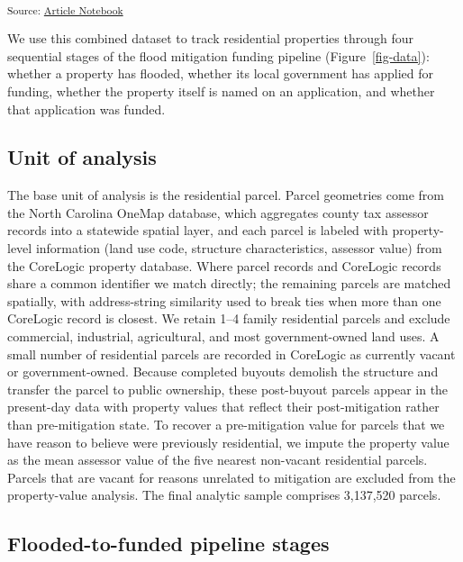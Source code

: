 \documentclass[
  authoryear,
  preprint]{elsarticle}
\begin{document}
\textsubscript{Source:
\href{https://russblessing.github.io/Obstacles/index-preview.html}{Article
Notebook}}

We use this combined dataset to track residential properties through
four sequential stages of the flood mitigation funding pipeline
(Figure~\ref{fig-data}): whether a property has flooded, whether its
local government has applied for funding, whether the property itself is
named on an application, and whether that application was funded.

\subsection{Unit of analysis}\label{unit-of-analysis}

The base unit of analysis is the residential parcel. Parcel geometries
come from the North Carolina OneMap database, which aggregates county
tax assessor records into a statewide spatial layer, and each parcel is
labeled with property-level information (land use code, structure
characteristics, assessor value) from the CoreLogic property database.
Where parcel records and CoreLogic records share a common identifier we
match directly; the remaining parcels are matched spatially, with
address-string similarity used to break ties when more than one
CoreLogic record is closest. We retain 1--4 family residential parcels
and exclude commercial, industrial, agricultural, and most
government-owned land uses. A small number of residential parcels are
recorded in CoreLogic as currently vacant or government-owned. Because
completed buyouts demolish the structure and transfer the parcel to
public ownership, these post-buyout parcels appear in the present-day
data with property values that reflect their post-mitigation rather than
pre-mitigation state. To recover a pre-mitigation value for parcels that
we have reason to believe were previously residential, we impute the
property value as the mean assessor value of the five nearest non-vacant
residential parcels. Parcels that are vacant for reasons unrelated to
mitigation are excluded from the property-value analysis. The final
analytic sample comprises 3,137,520 parcels.

\subsection{Flooded-to-funded pipeline
stages}\label{flooded-to-funded-pipeline-stages}
\end{document}
